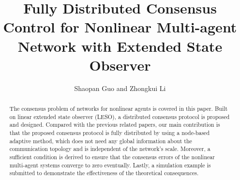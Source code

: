 \documentclass[english]{cccconf}
\begin{document}
\title{Fully Distributed Consensus Control for Nonlinear Multi-agent Network with Extended State Observer}

\author{Shaopan Guo and
        Zhongkui Li}



\maketitle

\begin{abstract}
The consensus problem of networks for nonlinear agents is covered in this paper. Built on linear extended state observer (LESO), a distributed consensus protocol is proposed and designed. Compared with the previous related papers, our main contribution is that the proposed consensus protocol is fully distributed by using a node-based adaptive method, which does not need any global information about the communication topology and is independent of the network's scale. Moreover, a sufficient condition is derived to ensure that the consensus errors of the nonlinear multi-agent systems converge to zero eventually. Lastly, a simulation example is submitted to demonstrate the effectiveness of the theoretical consequences.



\end{abstract}


\end{document}
